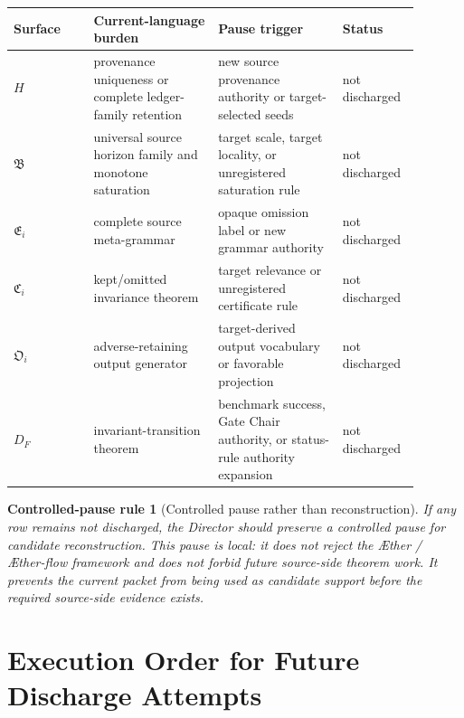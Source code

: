 \documentclass[11pt]{article}
\newcommand{\Aether}{\AE{}ther}
\newcommand{\Aflow}{\AE{}ther-flow}
\newcommand{\TheoryProgram}{\Aether{} / \Aflow{} framework}
\newcommand{\HorizonFam}{\mathfrak{B}}
\newcommand{\EnumFam}{\mathfrak{E}}
\newcommand{\CertFam}{\mathfrak{C}}
\newcommand{\OutFam}{\mathfrak{O}}
\newtheorem{pauserule}{Controlled-pause rule}
\begin{document}
\begin{center}
\begin{tabular}{p{0.18\linewidth}p{0.28\linewidth}p{0.28\linewidth}p{0.15\linewidth}}
\textbf{Surface} & \textbf{Current-language burden} & \textbf{Pause trigger} & \textbf{Status} \\
\hline
\(H\) & provenance uniqueness or complete ledger-family retention & new source provenance authority or target-selected seeds & not discharged \\
\(\HorizonFam\) & universal source horizon family and monotone saturation & target scale, target locality, or unregistered saturation rule & not discharged \\
\(\EnumFam_i\) & complete source meta-grammar & opaque omission label or new grammar authority & not discharged \\
\(\CertFam_i\) & kept/omitted invariance theorem & target relevance or unregistered certificate rule & not discharged \\
\(\OutFam_i\) & adverse-retaining output generator & target-derived output vocabulary or favorable projection & not discharged \\
\(D_F\) & invariant-transition theorem & benchmark success, Gate Chair authority, or status-rule authority expansion & not discharged \\
\end{tabular}
\end{center}

\begin{pauserule}[Controlled pause rather than reconstruction]
If any row remains not discharged, the Director should preserve a controlled
pause for candidate reconstruction. This pause is local: it does not reject
the \TheoryProgram{} and does not forbid future source-side theorem work.
It prevents the current packet from being used as candidate support before
the required source-side evidence exists.
\end{pauserule}

\section{Execution Order for Future Discharge Attempts}
\end{document}
